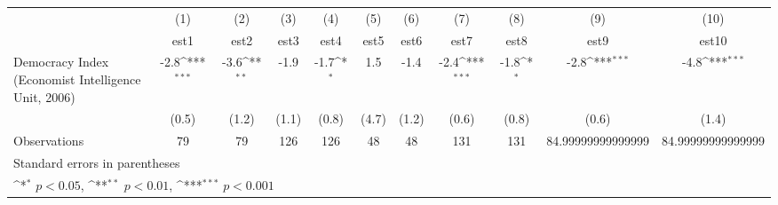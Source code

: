 {
\def\sym#1{\ifmmode^{#1}\else\(^{#1}\)\fi}
\begin{tabular}{l*{10}{c}}
\hline\hline
                    &\multicolumn{1}{c}{(1)}         &\multicolumn{1}{c}{(2)}         &\multicolumn{1}{c}{(3)}         &\multicolumn{1}{c}{(4)}         &\multicolumn{1}{c}{(5)}         &\multicolumn{1}{c}{(6)}         &\multicolumn{1}{c}{(7)}         &\multicolumn{1}{c}{(8)}         &\multicolumn{1}{c}{(9)}         &\multicolumn{1}{c}{(10)}         \\
                    &        est1         &        est2         &        est3         &        est4         &        est5         &        est6         &        est7         &        est8         &        est9         &       est10         \\
\hline
Democracy Index (Economist Intelligence Unit, 2006)&        -2.8\sym{***}&        -3.6\sym{**} &        -1.9         &        -1.7\sym{*}  &         1.5         &        -1.4         &        -2.4\sym{***}&        -1.8\sym{*}  &        -2.8\sym{***}&        -4.8\sym{***}\\
                    &       (0.5)         &       (1.2)         &       (1.1)         &       (0.8)         &       (4.7)         &       (1.2)         &       (0.6)         &       (0.8)         &       (0.6)         &       (1.4)         \\
\hline
Observations        &          79         &          79         &         126         &         126         &          48         &          48         &         131         &         131         &84.99999999999999         &84.99999999999999         \\
\hline\hline
\multicolumn{11}{l}{\footnotesize Standard errors in parentheses}\\
\multicolumn{11}{l}{\footnotesize \sym{*} \(p<0.05\), \sym{**} \(p<0.01\), \sym{***} \(p<0.001\)}\\
\end{tabular}
}
